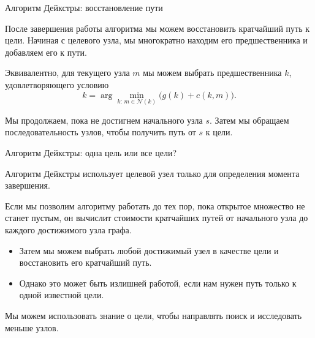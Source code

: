 \documentclass{beamer}
\begin{document}
	
	
	\begin{frame}{Алгоритм Дейкстры: восстановление пути}
		\begin{flushleft}
			
			После завершения работы алгоритма мы можем восстановить
			кратчайший путь к цели. Начиная с целевого узла, мы многократно находим
			его предшественника и добавляем его к пути.
			
			\medskip
			
			Эквивалентно, для текущего узла $m$ мы можем
			выбрать предшественника $k$, удовлетворяющего условию
			\[
			k=\arg\min_{k:\,m\in\mathcal{N}(k)}
			\bigl(g(k)+c(k,m)\bigr).
			\]
			
			Мы продолжаем, пока не достигнем начального узла $s$.
			Затем мы обращаем последовательность узлов, чтобы получить
			путь от $s$ к цели.
			
		\end{flushleft}
	\end{frame}
	
	\begin{frame}{Алгоритм Дейкстры: одна цель или все цели?}
		\begin{flushleft}
			
			Алгоритм Дейкстры использует целевой узел только
			для определения момента завершения.
			
			
			\medskip
			
			Если мы позволим алгоритму работать до тех пор, пока открытое множество
			не станет пустым, он вычислит стоимости кратчайших путей от
			начального узла до каждого достижимого
			узла графа.
			
			\begin{itemize}
				\item Затем мы можем выбрать любой достижимый узел
				в качестве цели и восстановить его кратчайший путь.
				\item Однако это может быть излишней работой,
				если нам нужен путь только к одной известной цели.
			\end{itemize}
			
			Мы можем использовать знание о цели, чтобы направлять
			поиск и исследовать меньше узлов.
			
		\end{flushleft}
	\end{frame}
	
\end{document}
